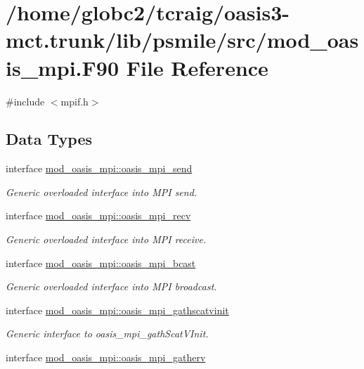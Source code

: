 \hypertarget{mod__oasis__mpi_8_f90}{}\section{/home/globc2/tcraig/oasis3-\/mct.trunk/lib/psmile/src/mod\+\_\+oasis\+\_\+mpi.F90 File Reference}
\label{mod__oasis__mpi_8_f90}
{\ttfamily \#include $<$mpif.\+h$>$}\newline
\subsection*{Data Types}
\begin{DoxyCompactItemize}
\item 
interface \hyperlink{interfacemod__oasis__mpi_1_1oasis__mpi__send}{mod\+\_\+oasis\+\_\+mpi\+::oasis\+\_\+mpi\+\_\+send}
\begin{DoxyCompactList}\small\item\em Generic overloaded interface into M\+PI send. \end{DoxyCompactList}\item 
interface \hyperlink{interfacemod__oasis__mpi_1_1oasis__mpi__recv}{mod\+\_\+oasis\+\_\+mpi\+::oasis\+\_\+mpi\+\_\+recv}
\begin{DoxyCompactList}\small\item\em Generic overloaded interface into M\+PI receive. \end{DoxyCompactList}\item 
interface \hyperlink{interfacemod__oasis__mpi_1_1oasis__mpi__bcast}{mod\+\_\+oasis\+\_\+mpi\+::oasis\+\_\+mpi\+\_\+bcast}
\begin{DoxyCompactList}\small\item\em Generic overloaded interface into M\+PI broadcast. \end{DoxyCompactList}\item 
interface \hyperlink{interfacemod__oasis__mpi_1_1oasis__mpi__gathscatvinit}{mod\+\_\+oasis\+\_\+mpi\+::oasis\+\_\+mpi\+\_\+gathscatvinit}
\begin{DoxyCompactList}\small\item\em Generic interface to oasis\+\_\+mpi\+\_\+gath\+Scat\+V\+Init. \end{DoxyCompactList}\item 
interface \hyperlink{interfacemod__oasis__mpi_1_1oasis__mpi__gatherv}{mod\+\_\+oasis\+\_\+mpi\+::oasis\+\_\+mpi\+\_\+gatherv}

\end{DoxyCompactItemize}
